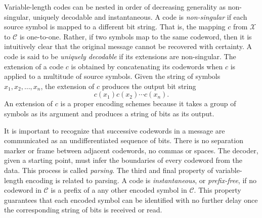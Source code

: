 Variable-length codes can be nested in order of decreasing generality as non-singular, uniquely decodable and instantaneous.
A code is \emph{non-singular} if each source symbol is mapped to a different bit string.
That is, the mapping $c$ from $\mathcal{X}$ to $\mathcal{C}$ is one-to-one.
Rather, if two symbols map to the same codeword, then it is intuitively clear that the original message cannot be recovered with certainty.
A code is said to be \emph{uniquely decodable} if its extensions are non-singular.
The extension of a code $c$ is obtained by concatenating its codewords when $c$ is applied to a multitude of source symbols.
Given the string of symbols $x_1, x_2, \ldots, x_n$, the extension of $c$ produces the output bit string
\begin{equation*}
c(x_1) c(x_2) \cdots c(x_n) .
\end{equation*}
An extension of $c$ is a proper encoding schemes because it takes a group of symbols as its argument and produces a string of bits as its output.

It is important to recognize that successive codewords in a message are communicated as an undifferentiated sequence of bits.
There is no separation marker or frame between adjacent codewords, no commas or spaces.
The decoder, given a starting point, must infer the boundaries of every codeword from the data.
This process is called \emph{parsing}.
The third and final property of variable-length encoding is related to parsing.
A code is \emph{instantaneous}, or \emph{prefix-free}, if no codeword in $\mathcal{C}$ is a prefix of a any other encoded symbol in $\mathcal{C}$.
This property guarantees that each encoded symbol can be identified with no further delay once the corresponding string of bits is received or read.

